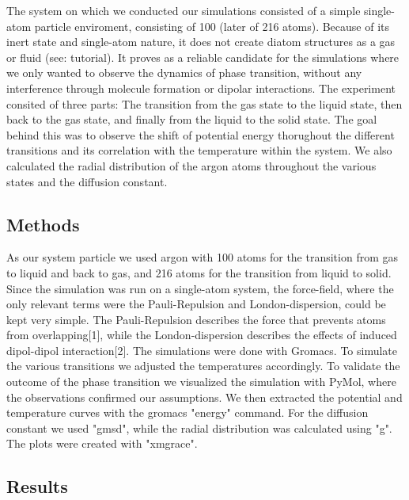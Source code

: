 \documentclass[10pt, a4paper, oneside, twocolumn]{article}
\begin{document}
The system on which we conducted our simulations consisted of a simple single-atom particle enviroment, consisting of 100 (later of 216 atoms). Because of its inert state and single-atom nature, it does not create diatom structures as a gas or fluid (see: tutorial). It proves as a reliable candidate for the simulations where we only wanted to observe the dynamics of phase transition, without any interference through molecule formation or dipolar interactions. The experiment consited of three parts:
The transition from the gas state to the liquid state, then back to the gas state, and finally from the liquid to the solid state. The goal behind this was to observe the shift of potential energy thorughout the different transitions and its correlation with the temperature within the system. We also calculated the radial distribution of the argon atoms throughout the various states and the diffusion constant.

\subsection{Methods}

As our system particle we used argon with 100 atoms for the transition from gas to liquid and back to gas, and 216 atoms for the transition from liquid to solid. Since the simulation was run on a single-atom system, the force-field, where the only relevant terms were the Pauli-Repulsion and London-dispersion, could be kept very simple. The Pauli-Repulsion describes the force that prevents atoms from overlapping[1], while the London-dispersion describes the effects of induced dipol-dipol interaction[2]. The simulations were done with Gromacs. To simulate the various transitions we adjusted the temperatures accordingly. To validate
the outcome of the phase transition we visualized the simulation with PyMol, where the observations confirmed our assumptions.
We then extracted the potential and temperature curves with the gromacs "energy" command. For the diffusion constant we used "gmsd", while the radial distribution was calculated using "g". The plots were created with "xmgrace".



\subsection{Results}
\end{document}
